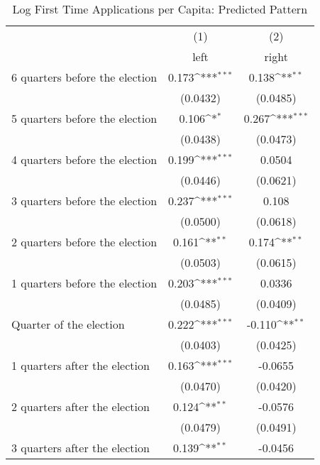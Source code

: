 \begin{table}[htbp]\centering
\def\sym#1{\ifmmode^{#1}\else\(^{#1}\)\fi}
\caption{Log First Time Applications per Capita: Predicted Pattern}
\begin{tabular}{l*{2}{c}}
\hline\hline
                    &\multicolumn{1}{c}{(1)}&\multicolumn{1}{c}{(2)}\\
                    &\multicolumn{1}{c}{left}&\multicolumn{1}{c}{right}\\
\hline
 6 quarters before the election&       0.173\sym{***}&       0.138\sym{**} \\
                    &    (0.0432)         &    (0.0485)         \\
[1em]
 5 quarters before the election&       0.106\sym{*}  &       0.267\sym{***}\\
                    &    (0.0438)         &    (0.0473)         \\
[1em]
 4 quarters before the election&       0.199\sym{***}&      0.0504         \\
                    &    (0.0446)         &    (0.0621)         \\
[1em]
 3 quarters before the election&       0.237\sym{***}&       0.108         \\
                    &    (0.0500)         &    (0.0618)         \\
[1em]
 2 quarters before the election&       0.161\sym{**} &       0.174\sym{**} \\
                    &    (0.0503)         &    (0.0615)         \\
[1em]
 1 quarters before the election&       0.203\sym{***}&      0.0336         \\
                    &    (0.0485)         &    (0.0409)         \\
[1em]
Quarter of the election&       0.222\sym{***}&      -0.110\sym{**} \\
                    &    (0.0403)         &    (0.0425)         \\
[1em]
 1 quarters after the election&       0.163\sym{***}&     -0.0655         \\
                    &    (0.0470)         &    (0.0420)         \\
[1em]
 2 quarters after the election&       0.124\sym{**} &     -0.0576         \\
                    &    (0.0479)         &    (0.0491)         \\
[1em]
 3 quarters after the election&       0.139\sym{**} &     -0.0456         \\

\end{tabular}
\end{table}
